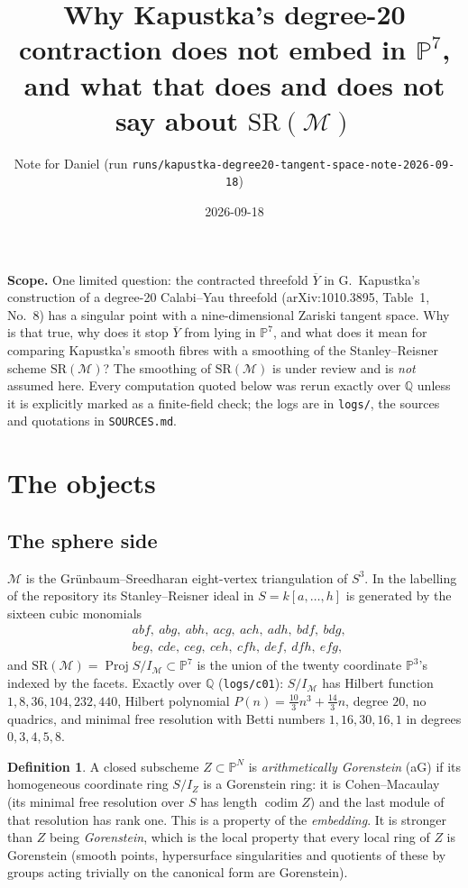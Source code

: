 \documentclass[10pt,a4paper]{article}
\title{\vspace{-1.2cm}Why Kapustka's degree-20 contraction does not
embed in $\mathbb{P}^7$,\\ and what that does and does not say about
$\mathrm{SR}(\mathcal{M})$}
\author{Note for Daniel \quad (run
\texttt{runs/kapustka-degree20-tangent-space-note-2026-09-18})}
\date{2026-09-18}
\theoremstyle{plain}
\theoremstyle{definition}
\newtheorem{definition}[theorem]{Definition}
\theoremstyle{remark}
\begin{document}
\maketitle
\vspace{-0.9cm}
\noindent\textbf{Scope.} One limited question: the contracted
threefold $\overline{Y}$ in G.~Kapustka's construction of a
degree-20 Calabi--Yau threefold (arXiv:1010.3895, Table~1, No.~8)
has a singular point with a nine-dimensional Zariski tangent
space. Why is that true, why does it stop $\overline{Y}$ from
lying in $\mathbb{P}^7$, and what does it mean for comparing
Kapustka's smooth fibres with a smoothing of the Stanley--Reisner
scheme $\mathrm{SR}(\mathcal{M})$? The smoothing of
$\mathrm{SR}(\mathcal{M})$ is under review and is \emph{not}
assumed here. Every computation quoted below was rerun exactly over
$\mathbb{Q}$ unless it is explicitly marked as a finite-field check;
the logs are in \texttt{logs/}, the sources and quotations in
\texttt{SOURCES.md}.

\section{The objects}

\subsection*{The sphere side}
$\mathcal{M}$ is the Gr\"unbaum--Sreedharan eight-vertex
triangulation of $S^3$. In the labelling of the repository its
Stanley--Reisner ideal in $S=k[a,\dots,h]$ is generated by the
sixteen cubic monomials
$$
\begin{aligned}
&abf,\ abg,\ abh,\ acg,\ ach,\ adh,\ bdf,\ bdg,\\
&beg,\ cde,\ ceg,\ ceh,\ cfh,\ def,\ dfh,\ efg ,
\end{aligned}
$$
and $\mathrm{SR}(\mathcal{M})=\operatorname{Proj} S/I_{\mathcal{M}}
\subset\mathbb{P}^7$ is the union of the twenty coordinate
$\mathbb{P}^3$'s indexed by the facets. Exactly over $\mathbb{Q}$
(\texttt{logs/c01}): $S/I_{\mathcal{M}}$ has Hilbert function
$1,8,36,104,232,440$, Hilbert polynomial
$P(n)=\tfrac{10}{3}n^3+\tfrac{14}{3}n$, degree $20$, no quadrics,
and minimal free resolution with Betti numbers $1,16,30,16,1$ in
degrees $0,3,4,5,8$.

\begin{definition}
A closed subscheme $Z\subset\mathbb{P}^N$ is \emph{arithmetically
Gorenstein} (aG) if its homogeneous coordinate ring $S/I_Z$ is a
Gorenstein ring: it is Cohen--Macaulay (its minimal free resolution
over $S$ has length $\operatorname{codim} Z$) and the last module of
that resolution has rank one. This is a property of the
\emph{embedding}. It is stronger than $Z$ being \emph{Gorenstein},
which is the local property that every local ring of $Z$ is
Gorenstein (smooth points, hypersurface singularities and quotients
of these by groups acting trivially on the canonical form are
Gorenstein).
\end{definition}
\end{document}
